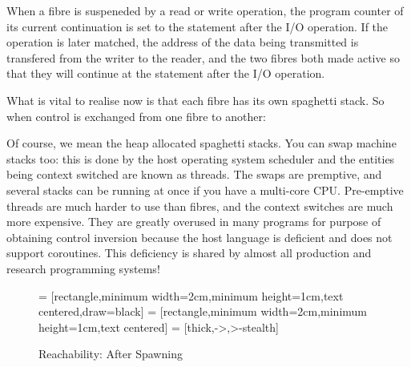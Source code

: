 \documentclass[oneside]{book}
\begin{document}
When a fibre is suspeneded by a read or write operation,
the program counter of its current continuation is set
to the statement after the I/O operation. If the operation
is later matched, the address of the data being transmitted
is transfered from the writer to the reader, and the two
fibres both made active so that they will continue
at the statement after the I/O operation.

What is vital to realise now is that each fibre has its
own spaghetti stack. So when control is exchanged
from one fibre to another:


Of course, we mean the heap allocated spaghetti stacks.
You can swap machine stacks too: this is done by the host
operating system scheduler and the entities being context
switched are known as threads. The swaps are premptive,
and several stacks can be running at once if you have a 
multi-core CPU. Pre-emptive threads are much harder to use
than fibres, and the context switches are much more
expensive. They are greatly overused in many programs
for purpose of obtaining control inversion because
the host language is deficient and does not support
coroutines. This deficiency is shared by almost all
production and research programming systems!

\begin{figure}
 = [rectangle,minimum width=2cm,minimum height=1cm,text centered,draw=black]
 = [rectangle,minimum width=2cm,minimum height=1cm,text centered]
 = [thick,->,>-stealth]
\caption{Reachability: After Spawning}
\end{figure}
\end{document}
